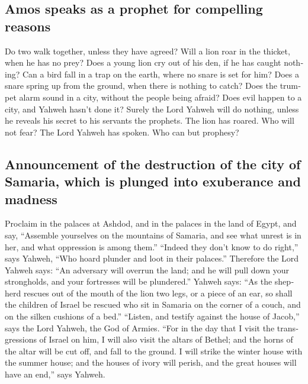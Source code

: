 \begin{paracol}{2}
\begin{otherlanguage}{english}
{\subsection{Amos speaks as a prophet for compelling
reasons}\label{amos-speaks-as-a-prophet-for-compelling-reasons}}

 Do two walk together, unless they have agreed?
 Will a lion roar in the thicket, when he has no prey?
Does a young lion cry out of his den, if he has caught nothing?
 Can a bird fall in a trap on the earth, where no snare is
set for him? Does a snare spring up from the ground, when there is
nothing to catch?  Does the trumpet alarm sound in a city,
without the people being afraid? Does evil happen to a city, and Yahweh
hasn't done it?  Surely the Lord Yahweh will do nothing,
unless he reveals his secret to his servants the prophets.
 The lion has roared. Who will not fear? The Lord Yahweh
has spoken. Who can but prophesy?

\hypertarget{announcement-of-the-destruction-of-the-city-of-samaria-which-is-plunged-into-exuberance-and-madness}{%
\subsection{Announcement of the destruction of the city of Samaria,
which is plunged into exuberance and
madness}\label{announcement-of-the-destruction-of-the-city-of-samaria-which-is-plunged-into-exuberance-and-madness}}

 Proclaim in the palaces at Ashdod, and in the palaces in
the land of Egypt, and say, ``Assemble yourselves on the mountains of
Samaria, and see what unrest is in her, and what oppression is among
them.''  ``Indeed they don't know to do right,'' says
Yahweh, ``Who hoard plunder and loot in their palaces.'' 
Therefore the Lord Yahweh says: ``An adversary will overrun the land;
and he will pull down your strongholds, and your fortresses will be
plundered.''  Yahweh says: ``As the shepherd rescues out
of the mouth of the lion two legs, or a piece of an ear, so shall the
children of Israel be rescued who sit in Samaria on the corner of a
couch, and on the silken cushions of a bed.''  ``Listen,
and testify against the house of Jacob,'' says the Lord Yahweh, the God
of Armies.  ``For in the day that I visit the
transgressions of Israel on him, I will also visit the altars of Bethel;
and the horns of the altar will be cut off, and fall to the ground.
 I will strike the winter house with the summer house;
and the houses of ivory will perish, and the great houses will have an
end,'' says Yahweh.


\end{otherlanguage}
\end{paracol}
